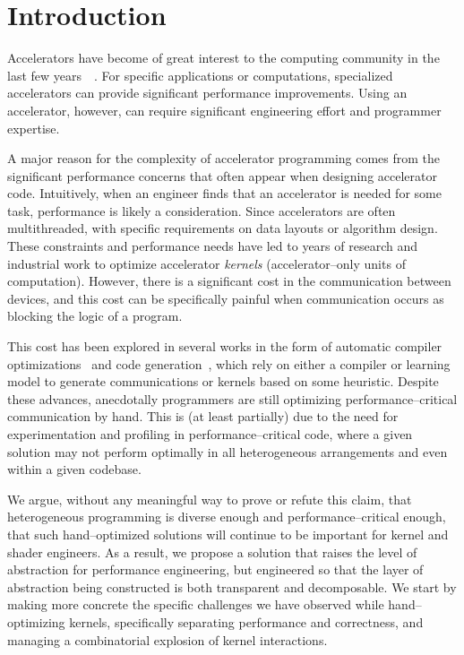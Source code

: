 \section{Introduction}
\label{sec:caimanintro}

Accelerators have become of great interest to the computing community in the last few years~\cite{acceleratorsurvey}~\cite{nnacceleration}.  For specific applications or computations, specialized accelerators can provide significant performance improvements.  Using an accelerator, however, can require significant engineering effort and programmer expertise.

A major reason for the complexity of accelerator programming comes from the significant performance concerns that often appear when designing accelerator code.  Intuitively, when an engineer finds that an accelerator is needed for some task, performance is likely a consideration.  Since accelerators are often multithreaded, with specific requirements on data layouts or algorithm design.  These constraints and performance needs have led to years of research and industrial work to optimize accelerator \emph{kernels} (accelerator--only units of computation).  However, there is a significant cost in the communication between devices, and this  cost can be specifically painful when communication occurs as blocking the logic of a program.

This cost has been explored in several works in the form of automatic compiler optimizations~\cite{gpgpuopti} and code generation~\cite{cudaevolve}, which rely on either a compiler or learning model to generate communications or kernels based on some heuristic.  Despite these advances, anecdotally programmers are still optimizing performance--critical communication by hand.  This is (at least partially) due to the need for experimentation and profiling in performance--critical code, where a given solution may not perform optimally in all heterogeneous arrangements and even within a given codebase.

We argue, without any meaningful way to prove or refute this claim, that heterogeneous programming is diverse enough and performance--critical enough, that such hand--optimized solutions will continue to be important for kernel and shader engineers.  As a result, we propose a solution that raises the level of abstraction for performance engineering, but engineered so that the layer of abstraction being constructed is both transparent and decomposable.  We start by making more concrete the specific challenges we have observed while hand--optimizing kernels, specifically separating performance and correctness, and managing a combinatorial explosion of kernel interactions.

